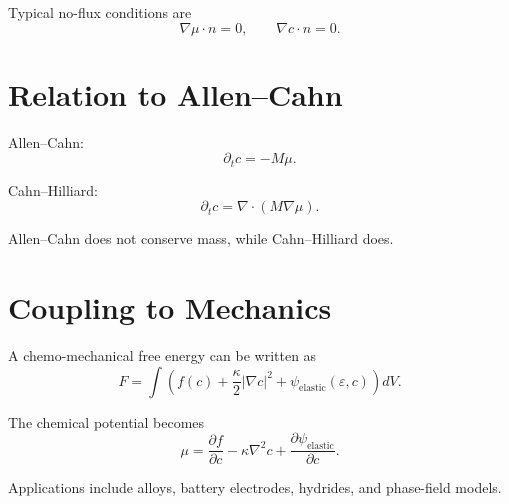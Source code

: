 \documentclass[11pt]{article}
\begin{document}
Typical no-flux conditions are
\[
\nabla\mu\cdot n=0,
\qquad
\nabla c\cdot n=0.
\]

\section{Relation to Allen--Cahn}

Allen--Cahn:
\[
\partial_t c=-M\mu.
\]

Cahn--Hilliard:
\[
\partial_t c=\nabla\cdot(M\nabla\mu).
\]

Allen--Cahn does not conserve mass, while Cahn--Hilliard does.

\section{Coupling to Mechanics}

A chemo-mechanical free energy can be written as
\[
F=
\int
\left(
f(c)
+\frac{\kappa}{2}|\nabla c|^2
+\psi_{\mathrm{elastic}}(\varepsilon,c)
\right)dV.
\]

The chemical potential becomes
\[
\mu
=
\frac{\partial f}{\partial c}
-\kappa\nabla^2 c
+
\frac{\partial \psi_{\mathrm{elastic}}}{\partial c}.
\]

Applications include alloys, battery electrodes, hydrides, and phase-field models.
\end{document}
